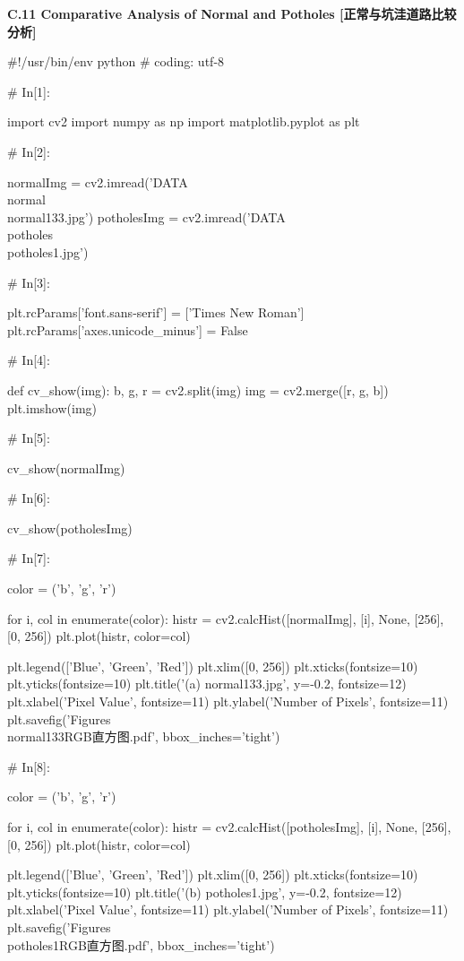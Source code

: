 \documentclass{MathorCupmodeling}
\begin{document}
\textbf{C.11 Comparative Analysis of Normal and Potholes [正常与坑洼道路比较分析]}
\begin{python}
#!/usr/bin/env python
# coding: utf-8

# In[1]:


import cv2
import numpy as np
import matplotlib.pyplot as plt

# In[2]:


normalImg = cv2.imread('DATA\\normal\\normal133.jpg')
potholesImg = cv2.imread('DATA\\potholes\\potholes1.jpg')

# In[3]:


plt.rcParams['font.sans-serif'] = ['Times New Roman']
plt.rcParams['axes.unicode_minus'] = False


# In[4]:


def cv_show(img):
    b, g, r = cv2.split(img)
    img = cv2.merge([r, g, b])
    plt.imshow(img)


# In[5]:


cv_show(normalImg)

# In[6]:


cv_show(potholesImg)

# In[7]:


color = ('b', 'g', 'r')

for i, col in enumerate(color):
    histr = cv2.calcHist([normalImg], [i], None, [256], [0, 256])
    plt.plot(histr, color=col)

plt.legend(['Blue', 'Green', 'Red'])
plt.xlim([0, 256])
plt.xticks(fontsize=10)
plt.yticks(fontsize=10)
plt.title('(a) normal133.jpg', y=-0.2, fontsize=12)
plt.xlabel('Pixel Value', fontsize=11)
plt.ylabel('Number of Pixels', fontsize=11)
plt.savefig('Figures\\normal133RGB直方图.pdf', bbox_inches='tight')

# In[8]:


color = ('b', 'g', 'r')

for i, col in enumerate(color):
    histr = cv2.calcHist([potholesImg], [i], None, [256], [0, 256])
    plt.plot(histr, color=col)

plt.legend(['Blue', 'Green', 'Red'])
plt.xlim([0, 256])
plt.xticks(fontsize=10)
plt.yticks(fontsize=10)
plt.title('(b) potholes1.jpg', y=-0.2, fontsize=12)
plt.xlabel('Pixel Value', fontsize=11)
plt.ylabel('Number of Pixels', fontsize=11)
plt.savefig('Figures\\potholes1RGB直方图.pdf', bbox_inches='tight')


\end{python}
\end{document}
